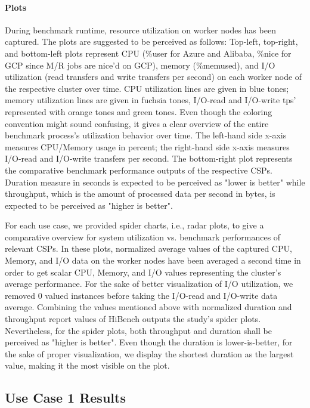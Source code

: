 \documentclass[review]{elsarticle}
\begin{document}
\paragraph{Plots}During benchmark runtime, resource utilization on worker nodes has been captured. The plots are suggested to be perceived as follows: Top-left, top-right, and bottom-left plots represent CPU (\%user for Azure and Alibaba, \%nice for GCP since M/R jobs are nice'd on GCP), memory (\%memused), and I/O utilization (read transfers and write transfers per second) on each worker node of the respective cluster over time. CPU utilization lines are given in blue tones; memory utilization lines are given in fuchsia tones, I/O-read and I/O-write tps' represented with orange tones and green tones. Even though the coloring convention might sound confusing, it gives a clear overview of the entire benchmark process's utilization behavior over time. The left-hand side x-axis measures CPU/Memory usage in percent; the right-hand side x-axis measures I/O-read and I/O-write transfers per second. The bottom-right plot represents the comparative benchmark performance outputs of the respective CSPs. Duration measure in seconds is expected to be perceived as "lower is better" while throughput, which is the amount of processed data per second in bytes, is expected to be perceived as "higher is better".

For each use case, we provided spider charts, i.e., radar plots, to give a comparative overview for system utilization vs. benchmark performances of relevant CSPs. In these plots, normalized average values of the captured CPU, Memory, and I/O data on the worker nodes have been averaged a second time in order to get scalar CPU, Memory, and I/O values representing the cluster's average performance. For the sake of better visualization of I/O utilization, we removed 0 valued instances before taking the I/O-read and I/O-write data average. Combining the values mentioned above with normalized duration and throughput report values of HiBench outputs the study's spider plots. Nevertheless, for the spider plots, both throughput and duration shall be perceived as "higher is better". Even though the duration is lower-is-better, for the sake of proper visualization, we display the shortest duration as the largest value, making it the most visible on the plot. 


\subsection{Use Case 1 Results}
\end{document}
